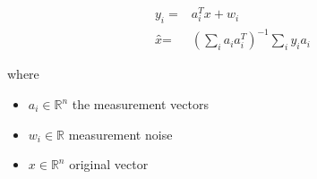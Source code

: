 \documentclass[12pt]{article}
\begin{document}
\begin{align*}
\textit{y}_{ \textit{i} } = & \textit{a}_{ \textit{i} }^T\textit{x} + \textit{w}_{ \textit{i} } \\
\textit{x̂} = & \left( \sum_\textit{i} \textit{a}_{ \textit{i} }\textit{a}_{ \textit{i} }^T \right)^{-1}\sum_\textit{i} \textit{y}_{ \textit{i} }\textit{a}_{ \textit{i} }
\end{align*}

where
\begin{itemize}
\item $\textit{a}_{\textit{i}} \in \mathbb{R}^{ \textit{n}}$ the measurement vectors  
\item $\textit{w}_{\textit{i}} \in \mathbb{{R}}$ measurement noise 
\item $\textit{x} \in \mathbb{R}^{ \textit{n}}$ original vector 
\end{itemize}
\end{document}
